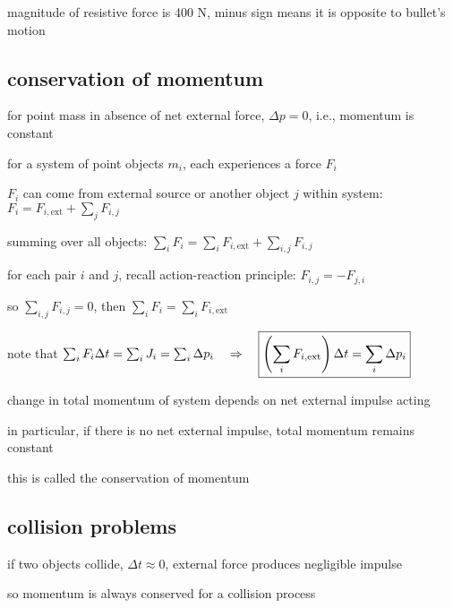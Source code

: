 magnitude of resistive force is 400 N, minus sign means it is opposite to bullet's motion

\subsection{conservation of momentum}

for point mass in absence of net external force, $\Delta p = 0$, i.e., momentum is constant


for a system of point objects $m_i$, each experiences a force $F_i$

$F_i$ can come from external source or another object $j$ within system: $F_i = F_{i,\text{ext}} + \sum_j F_{i,j}$

summing over all objects: $\sum_i F_i = \sum_i F_{i,\text{ext}} + \sum_{i,j} F_{i,j}$

for each pair $i$ and $j$, recall action-reaction principle: $F_{i,j} = -F_{j,i}$

so $\sum_{i,j} F_{i,j} = 0$, then $\sum_i F_i = \sum_i F_{i,\text{ext}}$

note that $\sum_i F_i \Delta t = \sum_i J_i = \sum_i \Delta p_i  \quad \Rightarrow \quad \boxed{\left(\sum_i F_{i,\text{ext}} \right)\Delta t = \sum_i \Delta p_i}$

\vspace*{\baselineskip}

change in total momentum of system depends on net external impulse acting

in particular, if there is no net external impulse, total momentum remains constant

this is called the conservation of momentum

\subsection{collision problems}

if two objects collide, $\Delta t \approx 0$, external force produces negligible impulse

so momentum is always conserved for a collision process

